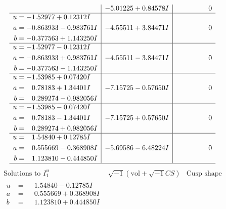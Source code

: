 \documentclass[1p]{elsarticle_modified}
\theoremstyle{definition}
\newcommand{\I}{\sqrt{-1}}
\begin{document}
$$\begin{array}{c|c|c}
 & -5.01225 + 0.84578 I & \phantom{-0.000000 } 0 \\ \hline\begin{aligned}
u &= -1.52977 + 0.12312 I \\
a &= -0.863933 - 0.983761 I \\
b &= -0.377563 + 1.143250 I\end{aligned}
 & -4.55511 + 3.84471 I & \phantom{-0.000000 } 0 \\ \hline\begin{aligned}
u &= -1.52977 - 0.12312 I \\
a &= -0.863933 + 0.983761 I \\
b &= -0.377563 - 1.143250 I\end{aligned}
 & -4.55511 - 3.84471 I & \phantom{-0.000000 } 0 \\ \hline\begin{aligned}
u &= -1.53985 + 0.07420 I \\
a &= \phantom{-}0.78183 + 1.34401 I \\
b &= \phantom{-}0.289274 - 0.982056 I\end{aligned}
 & -7.15725 - 0.57650 I & \phantom{-0.000000 } 0 \\ \hline\begin{aligned}
u &= -1.53985 - 0.07420 I \\
a &= \phantom{-}0.78183 - 1.34401 I \\
b &= \phantom{-}0.289274 + 0.982056 I\end{aligned}
 & -7.15725 + 0.57650 I & \phantom{-0.000000 } 0 \\ \hline\begin{aligned}
u &= \phantom{-}1.54840 + 0.12785 I \\
a &= \phantom{-}0.555669 - 0.368908 I \\
b &= \phantom{-}1.123810 - 0.444850 I\end{aligned}
 & -5.69586 - 6.48224 I & \phantom{-0.000000 } 0\\
 \hline 
 \end{array}$$\newpage$$\begin{array}{c|c|c}  
\text{Solutions to }I^u_{1}& \I (\text{vol} + \sqrt{-1}CS) & \text{Cusp shape}\\
 \hline 
\begin{aligned}
u &= \phantom{-}1.54840 - 0.12785 I \\
a &= \phantom{-}0.555669 + 0.368908 I \\
b &= \phantom{-}1.123810 + 0.444850 I\end{aligned}

\end{array}$$
\end{document}
